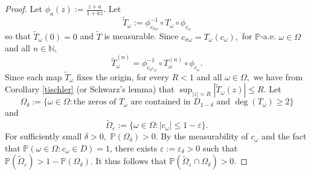 \documentclass[12pt,reqno]{amsart}
\numberwithin{theorem}{section}
\begin{document}
\begin{proof}  
    Let $\phi_{a}(z):=\frac{z+a}{1+\bar{a}z}.$ Let $$\tilde{T}_{\omega}:=\phi_{c_{\sigma\omega}}^{-1}\circ T_{\omega}\circ\phi_{c_{\omega}}$$ so that $\tilde{T}_{\omega}(0)=0$ and $\tilde{T}$ is measurable. Since $c_{\sigma\omega}=T_{\omega}(c_{\omega}),$ for $\mathbb{P}$-a.e. $\omega\in\Omega$ and all $n\in\mathbb{N},$ $$\tilde{T}_{\omega}^{(n)}=\phi_{c_{\sigma^{n}\omega}}^{-1}\circ T_{\omega}^{(n)}\circ\phi_{c_{\omega}}.$$ Since each map $\tilde{T}_{\omega}$ fixes the origin, for every $R<1$ and all $\omega\in\Omega,$ we have from Corollary \ref{tischler} (or Schwarz's lemma) that $\sup_{|z|=R}|\tilde{T}_{\omega}(z)|\le R.$
    Let $$\Omega_{\delta}:=\{\omega\in\Omega:\text{the zeros of }T_\omega\text{ are contained in }D_{1-\delta}\text{ and }\deg(T_{\omega})\ge2\}$$ and $$\tilde{\Omega}_{\varepsilon}:=\{\omega\in\Omega:|c_{\omega}|\le1-\varepsilon\}.$$ For sufficiently small $\delta>0,$ $\mathbb{P}(\Omega_{\delta})>0.$ By the measurability of $c_{\omega}$ and the fact that $\mathbb{P}(\omega\in\Omega:c_{\omega}\in D)=1$, there exists $\varepsilon:=\varepsilon_{\delta}>0$ such that $\mathbb{P}(\tilde{\Omega}_{\varepsilon})>1-\mathbb{P}(\Omega_{\delta}).$ It thus follows that $\mathbb{P}(\tilde{\Omega}_{\varepsilon}\cap\Omega_{\delta})>0.$
    

\end{proof}
\end{document}
